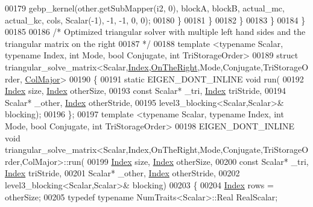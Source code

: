 \begin{DoxyCode}
00179             gebp\_kernel(other.getSubMapper(i2, 0), blockA, blockB, actual\_mc, actual\_kc, cols, Scalar(-1), 
      -1, -1, 0, 0);
00180           \}
00181         \}
00182       \}
00183     \}
00184   \}
00185 
00186 \textcolor{comment}{/* Optimized triangular solver with multiple left hand sides and the triangular matrix on the right}
00187 \textcolor{comment}{ */}
00188 \textcolor{keyword}{template} <\textcolor{keyword}{typename} Scalar, \textcolor{keyword}{typename} Index, \textcolor{keywordtype}{int} Mode, \textcolor{keywordtype}{bool} Conjugate, \textcolor{keywordtype}{int} TriStorageOrder>
00189 \textcolor{keyword}{struct }triangular\_solve\_matrix<Scalar,\hyperlink{namespace_eigen_a62e77e0933482dafde8fe197d9a2cfde}{Index},\hyperlink{group__enums_ggac22de43beeac7a78b384f99bed5cee0ba99dc75d8e00b6c3a5bdc31940f47492b}{OnTheRight},Mode,Conjugate,TriStorageOrder,
      \hyperlink{group__enums_ggaacded1a18ae58b0f554751f6cdf9eb13a0cbd4bdd0abcfc0224c5fcb5e4f6669a}{ColMajor}>
00190 \{
00191   \textcolor{keyword}{static} EIGEN\_DONT\_INLINE \textcolor{keywordtype}{void} run(
00192     \hyperlink{namespace_eigen_a62e77e0933482dafde8fe197d9a2cfde}{Index} size, \hyperlink{namespace_eigen_a62e77e0933482dafde8fe197d9a2cfde}{Index} otherSize,
00193     \textcolor{keyword}{const} Scalar* \_tri, \hyperlink{namespace_eigen_a62e77e0933482dafde8fe197d9a2cfde}{Index} triStride,
00194     Scalar* \_other, \hyperlink{namespace_eigen_a62e77e0933482dafde8fe197d9a2cfde}{Index} otherStride,
00195     level3\_blocking<Scalar,Scalar>& blocking);
00196 \};
00197 \textcolor{keyword}{template} <\textcolor{keyword}{typename} Scalar, \textcolor{keyword}{typename} Index, \textcolor{keywordtype}{int} Mode, \textcolor{keywordtype}{bool} Conjugate, \textcolor{keywordtype}{int} TriStorageOrder>
00198 EIGEN\_DONT\_INLINE \textcolor{keywordtype}{void} 
      triangular\_solve\_matrix<Scalar,Index,OnTheRight,Mode,Conjugate,TriStorageOrder,ColMajor>::run(
00199     \hyperlink{namespace_eigen_a62e77e0933482dafde8fe197d9a2cfde}{Index} size, \hyperlink{namespace_eigen_a62e77e0933482dafde8fe197d9a2cfde}{Index} otherSize,
00200     \textcolor{keyword}{const} Scalar* \_tri, \hyperlink{namespace_eigen_a62e77e0933482dafde8fe197d9a2cfde}{Index} triStride,
00201     Scalar* \_other, \hyperlink{namespace_eigen_a62e77e0933482dafde8fe197d9a2cfde}{Index} otherStride,
00202     level3\_blocking<Scalar,Scalar>& blocking)
00203   \{
00204     \hyperlink{namespace_eigen_a62e77e0933482dafde8fe197d9a2cfde}{Index} rows = otherSize;
00205     \textcolor{keyword}{typedef} \textcolor{keyword}{typename} NumTraits<Scalar>::Real RealScalar;

\end{DoxyCode}
